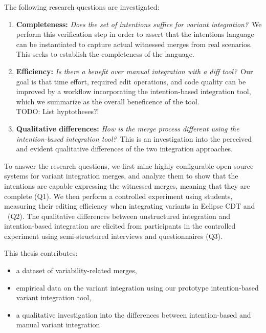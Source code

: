 The following research questions are investigated:

\newcommand{\RQA}{Does the set of intentions suffice for variant integration?}
\newcommand{\RQB}{Is there a benefit over manual integration with a diff tool?}
\newcommand{\RQC}{How is the merge process different using the intention-based integration tool?}

\begin{enumerate}[label={Q\arabic*}]

        \item\label{rq-a} \textbf{Completeness:} \textit{\RQA}~We perform this verification step in order to assert that the intentions language can be instantiated to capture actual witnessed merges from real scenarios. This seeks to establish the completeness of the language.

        \item\label{rq-b} \textbf{Efficiency:} \textit{\RQB}~Our goal is that time effort, required edit operations, and code quality can be improved by a workflow incorporating the intention-based integration tool, which we summarize as the overall beneficence of the tool.\\
        TODO: List hyptotheses?!

        
        \item\label{rq-c} \textbf{Qualitative differences:} \textit{\RQC}~This is an investigation into the perceived and evident qualitative differences of the two integration approaches.
        
\end{enumerate}

To answer the research questions, we first mine highly configurable open source systems for variant integration merges, and analyze them to show that the intentions are capable expressing the witnessed merges, meaning that they are complete (Q1). We then perform a controlled experiment using students, measuring their editing efficiency when integrating variants in Eclipse CDT and \tooln~(Q2). The qualitative differences between unstructured integration and intention-based integration are elicited from participants in the controlled experiment using semi-structured interviews and questionnaires (Q3).

This thesis contributes:
\begin{itemize}
    \item a dataset of variability-related merges,
    \item empirical data on the variant integration using our prototype intention-based variant integration tool,
    \item a qualitative investigation into the differences between intention-based and manual variant integration
\end{itemize}

